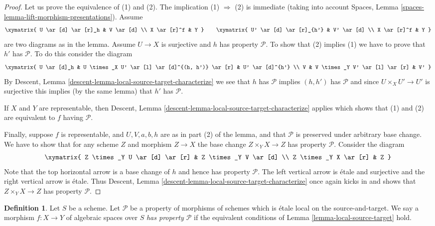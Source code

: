 \documentclass{stacks-project}
\theoremstyle{plain}
\theoremstyle{definition}
\newtheorem{definition}[subsection]{Definition}
\theoremstyle{remark}
\numberwithin{equation}{subsection}
\begin{document}
\begin{proof}
Let us prove the equivalence of (1) and (2).
The implication (1) $\Rightarrow$ (2) is immediate (taking into account
Spaces, Lemma \ref{spaces-lemma-lift-morphism-presentations}).
Assume
$$
\xymatrix{
U \ar[d] \ar[r]_h & V \ar[d] \\
X \ar[r]^f & Y
}
\quad\quad
\xymatrix{
U' \ar[d] \ar[r]_{h'} & V' \ar[d] \\
X \ar[r]^f & Y
}
$$
are two diagrams as in the lemma. Assume $U \to X$ is
surjective and $h$ has property $\mathcal{P}$. To show that (2)
implies (1) we have to prove that $h'$ has $\mathcal{P}$. To do
this consider the diagram
$$
\xymatrix{
U \ar[d]_h &
U \times_X U' \ar[l] \ar[d]^{(h, h')} \ar[r] &
U' \ar[d]^{h'} \\
V &
V \times_Y V' \ar[l] \ar[r] &
V'
}
$$
By
Descent, Lemma \ref{descent-lemma-local-source-target-characterize}
we see that $h$ has $\mathcal{P}$ implies $(h, h')$ has $\mathcal{P}$
and since $U \times_X U' \to U'$ is surjective this implies (by the
same lemma) that $h'$ has $\mathcal{P}$.

\medskip\noindent
If $X$ and $Y$ are representable, then
Descent, Lemma \ref{descent-lemma-local-source-target-characterize}
applies which shows that (1) and (2) are equivalent to $f$ having
$\mathcal{P}$.

\medskip\noindent
Finally, suppose $f$ is representable, and $U, V, a, b, h$ are
as in part (2) of the lemma, and that $\mathcal{P}$ is preserved under
arbitrary base change. We have to show that for any scheme
$Z$ and morphism $Z \to X$ the base change $Z \times_Y X \to Z$
has property $\mathcal{P}$. Consider the diagram
$$
\xymatrix{
Z \times_Y U \ar[d] \ar[r] &
Z \times_Y V \ar[d] \\
Z \times_Y X \ar[r] &
Z
}
$$
Note that the top horizontal arrow is a base change of $h$ and
hence has property $\mathcal{P}$. The left vertical arrow is \'etale
and surjective and the right vertical arrow is \'etale. Thus
Descent, Lemma \ref{descent-lemma-local-source-target-characterize}
once again kicks in and shows that $Z \times_Y X \to Z$
has property $\mathcal{P}$.
\end{proof}

\begin{definition}
\label{definition-P}
Let $S$ be a scheme.
Let $\mathcal{P}$ be a property of morphisms of schemes
which is \'etale local on the source-and-target.
We say a morphism $f : X \to Y$ of algebraic spaces over $S$
{\it has property $\mathcal{P}$} if the equivalent conditions of
Lemma \ref{lemma-local-source-target}
hold.
\end{definition}
\end{document}
